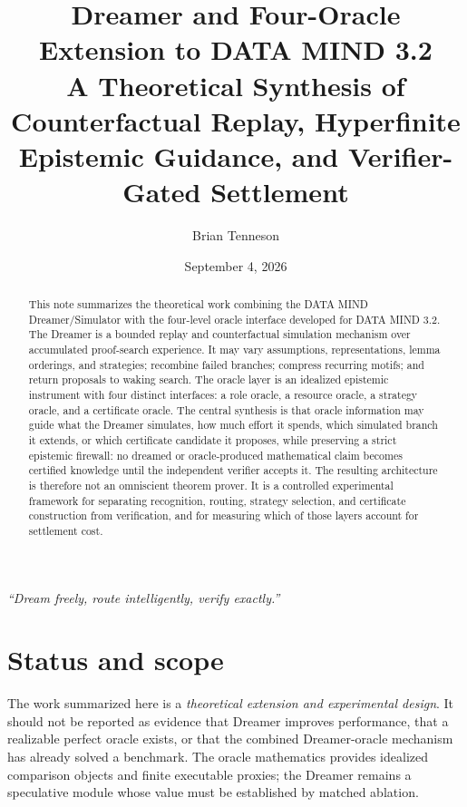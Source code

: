 \documentclass[11pt]{article}
\title{\textbf{Dreamer and Four-Oracle Extension to DATA MIND 3.2}\\[0.35em]
\large A Theoretical Synthesis of Counterfactual Replay, Hyperfinite Epistemic Guidance, and Verifier-Gated Settlement}
\author{Brian Tenneson}
\date{September 4, 2026}
\begin{document}
\maketitle

\begin{center}
\begin{minipage}{0.86\textwidth}
\centering\itshape
``Dream freely, route intelligently, verify exactly.''
\end{minipage}
\end{center}

\begin{abstract}
This note summarizes the theoretical work combining the DATA MIND Dreamer/Simulator with the four-level oracle interface developed for DATA MIND 3.2. The Dreamer is a bounded replay and counterfactual simulation mechanism over accumulated proof-search experience. It may vary assumptions, representations, lemma orderings, and strategies; recombine failed branches; compress recurring motifs; and return proposals to waking search. The oracle layer is an idealized epistemic instrument with four distinct interfaces: a role oracle, a resource oracle, a strategy oracle, and a certificate oracle. The central synthesis is that oracle information may guide what the Dreamer simulates, how much effort it spends, which simulated branch it extends, or which certificate candidate it proposes, while preserving a strict epistemic firewall: no dreamed or oracle-produced mathematical claim becomes certified knowledge until the independent verifier accepts it. The resulting architecture is therefore not an omniscient theorem prover. It is a controlled experimental framework for separating recognition, routing, strategy selection, and certificate construction from verification, and for measuring which of those layers account for settlement cost.
\end{abstract}

\tableofcontents
\newpage

\section{Status and scope}

The work summarized here is a \emph{theoretical extension and experimental design}. It should not be reported as evidence that Dreamer improves performance, that a realizable perfect oracle exists, or that the combined Dreamer-oracle mechanism has already solved a benchmark. The oracle mathematics provides idealized comparison objects and finite executable proxies; the Dreamer remains a speculative module whose value must be established by matched ablation.
\end{document}
